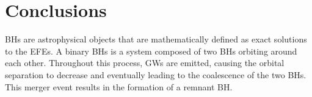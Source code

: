 \section{Conclusions}


BHs are astrophysical objects that are mathematically defined as exact solutions to the EFEs. A binary BHs is a system composed of two BHs orbiting around each other. Throughout this process, GWs are emitted, causing the orbital separation to decrease and eventually leading to the coalescence of the two BHs. This merger event results in the formation of a remnant BH.
